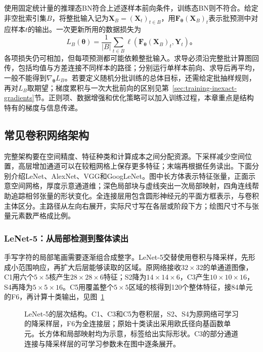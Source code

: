 使用固定统计量的推理态BN符合上述逐样本前向条件，训练态BN则不符合。给定非空批索引集$B$，将整批输入记为$\bm X_B=(\bm X_t)_{t\in B}$，用$\bm F_{\bm\theta}(\bm X_B)_t$表示批预测中对应样本$t$的输出。一次更新所用的数据损失为
\begin{equation}
  L_B(\bm\theta)=\frac1{|B|}\sum_{t\in B}
    \ell\!\left(\bm F_{\bm\theta}(\bm X_B)_t,\bm Y_t\right)\text{。}
  \label{eq:cnn-batch-objective}
\end{equation}
各项损失仍可相加，但每项预测都可能依赖整批输入。求导必须沿完整批计算图回传，包括均值与方差连接不同样本的路径；分别运行单样本前向、求导后再平均，一般不能得到$\nabla_{\bm\theta}L_B$。若要定义随机分批训练的总体目标，还需给定批抽样规则，再对$L_B$取期望；梯度累积与一次大批前向的区别见第~\ref{sec:training-inexact-gradients}节。正则项、数据增强和优化策略可以加入训练过程，本章重点是结构特有的梯度与信息传递。

\FloatBarrier

\subsection{常见卷积网络架构}
\label{sec:cnn-classic-architectures}

完整架构要在空间精度、特征种类和计算成本之间分配资源。下采样减少空间位置，高层增加通道可以在较粗网格上保存更多特征；末端再根据任务读出。下面分别介绍LeNet、AlexNet、VGG和GoogLeNet。图中长方体表示特征张量，正面示意空间网格，厚度示意通道维；深色局部块与虚线突出一次局部映射，四角连线帮助追踪相邻张量的形状变化。全连接层用包含圆形神经元的平面方框表示，与卷积主体区分。主路径从左向右展开，实际尺寸写在各层或阶段下方；绘图尺寸不与张量元素数严格成比例。

\subsubsection{LeNet-5：从局部检测到整体读出}
\label{sec:cnn-lenet}

手写字符的局部笔画需要逐渐组合成整字。LeNet-5交替使用卷积与降采样，先形成小范围响应，再扩大后层能够读取的区域。原网络接收$32\times32$的单通道图像，C1用六个$5\times5$核产生$28\times28\times6$特征；S2降为$14\times14\times6$，C3产生$10\times10\times16$，S4再降为$5\times5\times16$。C5用覆盖整个$5\times5$区域的核得到120个整体特征，接84单元的F6，再计算十类输出，见图~\ref{fig:cnn-lenet}

\begin{figure}[tbp]
  \centering
  
  \caption{LeNet-5的层次结构。C1、C3和C5为卷积层，S2、S4为原网络可学习的降采样层，F6为全连接层；原始十类读出采用欧氏径向基函数单元。长方体和局部映射均为示意，标签给出实际形状。C3的部分通道连接与降采样层的可学习参数未在图中逐条展开。}
  \label{fig:cnn-lenet}
\end{figure}

